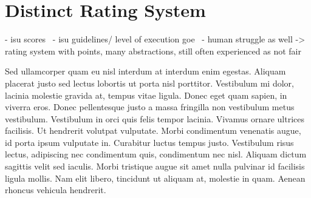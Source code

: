 %



\section{Distinct Rating System}
- isu scores~\cite{isuscores}
- isu guidelines/ level of execution goe~\cite{isuguideleinesgoe}
- human struggle as well -> rating system with points, many abstractions, still often experienced as not fair

Sed ullamcorper quam eu nisl interdum at interdum enim egestas. Aliquam placerat justo sed lectus lobortis ut porta
nisl porttitor. Vestibulum mi dolor, lacinia molestie gravida at, tempus vitae ligula. Donec eget quam sapien, in
viverra eros. Donec pellentesque justo a massa fringilla non vestibulum metus vestibulum. Vestibulum in orci quis
felis tempor lacinia. Vivamus ornare ultrices facilisis. Ut hendrerit volutpat vulputate. Morbi condimentum venenatis
augue, id porta ipsum vulputate in. Curabitur luctus tempus justo. Vestibulum risus lectus, adipiscing nec
condimentum quis, condimentum nec nisl. Aliquam dictum sagittis velit sed iaculis. Morbi tristique augue sit amet
nulla pulvinar id facilisis ligula mollis. Nam elit libero, tincidunt ut aliquam at, molestie in quam. Aenean rhoncus
vehicula hendrerit.

